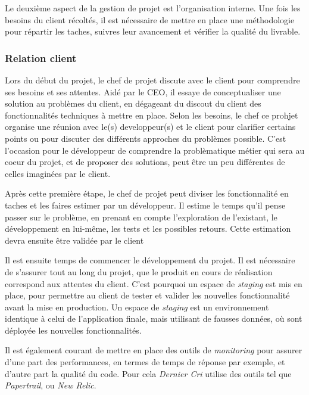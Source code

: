 Le deuxième aspect de la gestion de projet est l'organisation interne.
Une fois les besoins du client récoltés, il est nécessaire de mettre en
place une méthodologie pour répartir les taches, suivres leur avancement
et vérifier la qualité du livrable.

\bigskip

\subsubsection{Relation client}\label{relation-client}

\bigskip

Lors du début du projet, le chef de projet discute avec le client pour
comprendre ses besoins et ses attentes. Aidé par le CEO, il essaye de
conceptualiser une solution au problèmes du client, en dégageant du
discout du client des fonctionnalités techniques à mettre en place.
Selon les besoins, le chef ce prohjet organise une réunion avec le(s)
developpeur(s) et le client pour clarifier certains points ou pour
discuter des différents approches du problèmes possible. C'est
l'occasion pour le développeur de comprendre la problèmatique métier qui
sera au coeur du projet, et de proposer des solutions, peut être un peu
différentes de celles imaginées par le client.

\bigskip

Après cette première étape, le chef de projet peut diviser les
fonctionnalité en taches et les faires estimer par un développeur. Il
estime le temps qu'il pense passer sur le problème, en prenant en compte
l'exploration de l'existant, le développement en lui-même, les tests et
les possibles retours. Cette estimation devra ensuite être validée par
le client

\bigskip

Il est ensuite temps de commencer le développement du projet. Il est
nécessaire de s'assurer tout au long du projet, que le produit en cours
de réalisation correspond aux attentes du client. C'est pourquoi un
espace de \emph{staging} est mis en place, pour permettre au client de
tester et valider les nouvelles fonctionnalité avant la mise en
production. Un espace de \emph{staging} est un environnement identique à
celui de l'application finale, mais utilisant de fausses données, où
sont déployée les nouvelles fonctionnalités.

\bigskip

Il est également courant de mettre en place des outils de
\emph{monitoring} pour assurer d'une part des performances, en termes de
temps de réponse par exemple, et d'autre part la qualité du code. Pour
cela \emph{Dernier Cri} utilise des outils tel que \emph{Papertrail}, ou
\emph{New Relic}.

